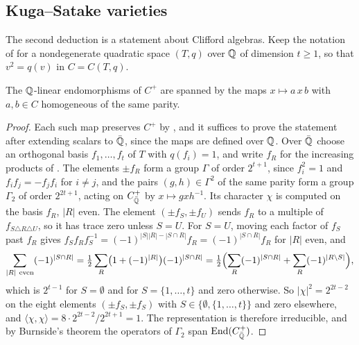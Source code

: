 \subsection{Kuga--Satake varieties}\label{ssec:kspowers}

The second deduction is a statement about Clifford algebras. Keep the
notation of  for a nondegenerate quadratic space $(T,q)$
over $\mathbb{Q}$ of dimension $t\ge1$, so that $v^{2}=q(v)$ in $C=C(T,q)$.

\begin{lemma}\label{lem:cliffordspan}
The $\mathbb{Q}$-linear endomorphisms of $C^{+}$ are spanned by the maps
$x\mapsto a\,x\,b$ with $a,b\in C$ homogeneous of the same parity.
\end{lemma}

\begin{proof}
Each such map preserves $C^{+}$ by , and it suffices to
prove the statement after extending scalars to $\bar{\mathbb{Q}}$, since the maps
are defined over $\mathbb{Q}$. Over $\bar{\mathbb{Q}}$ choose an orthogonal basis
$f_{1},\dots,f_{t}$ of $T$ with $q(f_{i})=1$, and write $f_{R}$ for the
increasing products of . The elements $\pm f_{R}$ form a
group $\Gamma$ of order $2^{t+1}$, since $f_{i}^{2}=1$ and
$f_{i}f_{j}=-f_{j}f_{i}$ for $i\ne j$, and the pairs $(g,h)\in\Gamma^{2}$ of
the same parity form a group $\Gamma_{2}$ of order $2^{2t+1}$, acting on
$C^{+}_{\bar{\mathbb{Q}}}$ by $x\mapsto gxh^{-1}$. Its character $\chi$ is
computed on the basis $f_{R}$, $|R|$ even. The element
$(\pm f_{S},\pm f_{U})$ sends $f_{R}$ to a multiple of
$f_{S\triangle R\triangle U}$, so it has trace zero unless $S=U$. For $S=U$,
moving each factor of $f_{S}$ past $f_{R}$ gives
$f_{S}f_{R}f_{S}^{-1}=(-1)^{|S||R|-|S\cap R|}f_{R}=(-1)^{|S\cap R|}f_{R}$ for
$|R|$ even, and
\[
  \sum_{|R|\ \mathrm{even}}(-1)^{|S\cap R|}
  =\tfrac12\sum_{R}\bigl(1+(-1)^{|R|}\bigr)(-1)^{|S\cap R|}
  =\tfrac12\Bigl(\sum_{R}(-1)^{|S\cap R|}+\sum_{R}(-1)^{|R\setminus S|}\Bigr),
\]
which is $2^{t-1}$ for $S=\emptyset$ and for $S=\{1,\dots,t\}$ and zero
otherwise. So $|\chi|^{2}=2^{2t-2}$ on the eight elements
$(\pm f_{S},\pm f_{S})$ with $S\in\{\emptyset,\{1,\dots,t\}\}$ and zero
elsewhere, and
$\langle\chi,\chi\rangle=8\cdot2^{2t-2}/2^{2t+1}=1$. The representation is
therefore irreducible, and by Burnside's theorem the operators of
$\Gamma_{2}$ span $\operatorname{End}(C^{+}_{\bar{\mathbb{Q}}})$.
\end{proof}


